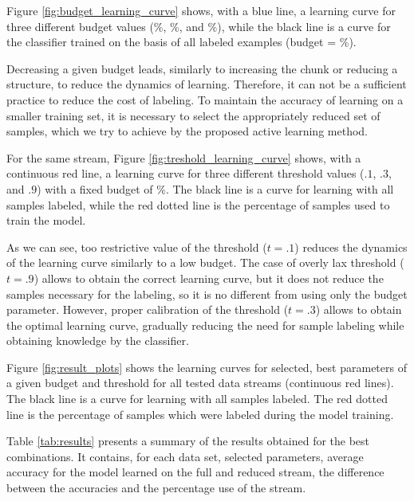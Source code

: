 Figure \ref{fig:budget_learning_curve} shows, with a blue line, a learning curve for three different budget values (\%, \%, and \%), while the black line is a curve for the classifier trained on the basis of all labeled examples (budget = \%).



Decreasing a given budget leads, similarly to increasing the chunk or reducing a structure, to reduce the dynamics of learning. Therefore, it can not be a sufficient practice to reduce the cost of labeling. To maintain the accuracy of learning on a smaller training set, it is necessary to select the appropriately reduced set of samples, which we try to achieve by the proposed active learning method.

For the same stream, Figure \ref{fig:treshold_learning_curve} shows, with a continuous red line, a learning curve for three different threshold values ($.1$, $.3$, and $.9$) with a fixed budget of \%. The black line is a curve for learning with all samples labeled, while the red dotted line is the percentage of samples used to train the model.



As we can see, too restrictive value of the threshold ($t = .1$) reduces the dynamics of the learning curve similarly to a low budget. The case of overly lax threshold ($t = .9$) allows to obtain the correct learning curve, but it does not reduce the samples necessary for the labeling, so it is no different from using only the budget parameter. However, proper calibration of the threshold ($t = .3$) allows to obtain the optimal learning curve, gradually reducing the need for sample labeling while obtaining knowledge by the classifier.

Figure \ref{fig:result_plots} shows the learning curves for selected, best parameters of a given budget and threshold for all tested data streams (continuous red lines). The black line is a curve for learning with all samples labeled. The red dotted line is the percentage of samples which were labeled during the model training.



Table \ref{tab:results} presents a summary of the results obtained for the best combinations. It contains, for each data set, selected parameters, average accuracy for the model learned on the full and reduced stream, the difference between the accuracies and the percentage use of the stream.

